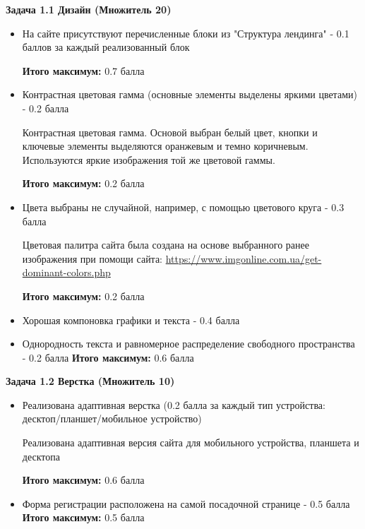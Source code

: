 \solutionSection

\textbf{Задача 1.1 Дизайн (Множитель 20)}

\begin{itemize}
    \item На сайте присутствуют перечисленные блоки из "Структура лендинга" - 0.1 баллов за каждый реализованный блок 

    \textbf{Итого максимум:} 0.7 балла

    \item Контрастная цветовая гамма (основные элементы выделены яркими цветами) - 0.2 балла

    Контрастная цветовая гамма. Основой выбран белый цвет, кнопки и ключевые элементы выделяются оранжевым и темно коричневым. Используются яркие изображения той же цветовой гаммы.


    \textbf{Итого максимум:} 0.2 балла

    \item Цвета выбраны не случайной, например, с помощью цветового круга - 0.3 балла

    Цветовая палитра сайта была создана на основе выбранного ранее изображения при помощи сайта: \url{https://www.imgonline.com.ua/get-dominant-colors.php}

    
    \textbf{Итого максимум:} 0.2 балла

    \item Хорошая компоновка графики и текста - 0.4 балла
    \item Однородность текста и равномерное распределение свободного пространства - 0.2 балла
    \textbf{Итого максимум:} 0.6 балла
\end{itemize}

\textbf{Задача 1.2 Верстка (Множитель 10)}
\begin{itemize}
    \item Реализована адаптивная верстка (0.2 балла за каждый тип устройства: десктоп/планшет/мобильное устройство)

    Реализована адаптивная версия сайта для мобильного устройства, планшета и десктопа 

    \textbf{Итого максимум:} 0.6 балла

    \item Форма регистрации расположена на самой посадочной странице - 0.5 балла
    \textbf{Итого максимум:} 0.5 балла
\end{itemize}

